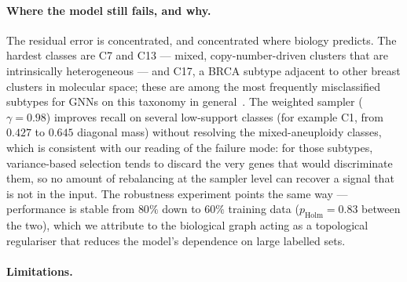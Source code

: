 \documentclass[review,3p,times,11pt, ]{elsarticle} %
\begin{document}
\paragraph{Where the model still fails, and why.}
The residual error is concentrated, and concentrated where biology
predicts. The hardest classes are C7 and C13 — mixed, copy-number-driven
clusters that are intrinsically heterogeneous — and C17, a BRCA subtype
adjacent to other breast clusters in molecular space; these are among
the most frequently misclassified subtypes for GNNs on this taxonomy in
general~\cite{xiao_graph_2023, li_cancer_2021}. The weighted sampler
($\gamma = 0.98$) improves recall on several low-support classes (for
example C1, from $0.427$ to $0.645$ diagonal mass) without resolving the
mixed-aneuploidy classes, which is consistent with our reading of the
failure mode: for those subtypes, variance-based selection tends to
discard the very genes that would discriminate them, so no amount of
rebalancing at the sampler level can recover a signal that is not in the
input. The robustness experiment points the same way — performance is
stable from $80\%$ down to $60\%$ training data
($p_{\text{Holm}} = 0.83$ between the two), which we attribute to the
biological graph acting as a topological regulariser that reduces the
model's dependence on large labelled sets.

\paragraph{Limitations.}
\end{document}
